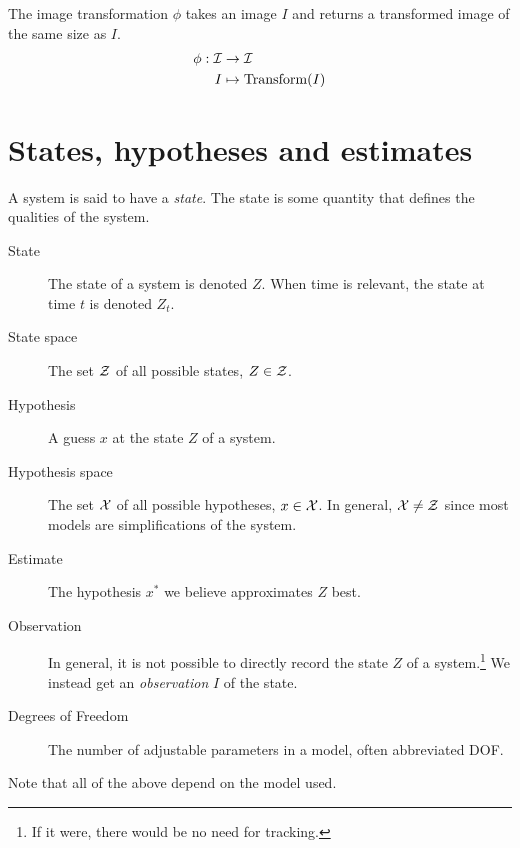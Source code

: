 \begin{definition}
    The image transformation $\phi$ takes an image $I$ and returns a transformed image of the same size as $I$.
    \begin{equation}
        \begin{split}
            \phi : \mathcal{I} &\rightarrow \mathcal{I}\\
                I &\mapsto \text{Transform}(I)
        \end{split}
    \end{equation}
\end{definition}


\section{States, hypotheses and estimates}
A system is said to have a \emph{state}. The state is some quantity that defines the qualities of the system.

\begin{description}
\item[State] The state of a system is denoted $Z$. When time is relevant, the state at time $t$ is denoted $Z_t$.
\item[State space] The set $\mathcal{Z}$ of all possible states, $Z \in \mathcal{Z}$.
\item[Hypothesis] A guess $x$ at the state $Z$ of a system.
\item[Hypothesis space] The set $\mathcal{X}$ of all possible hypotheses, $x \in \mathcal{X}$. In general, $\mathcal{X} \neq \mathcal{Z}$ since most models are simplifications of the system.
\item[Estimate] The hypothesis $x^*$ we believe approximates $Z$ best.
\item[Observation]
In general, it is not possible to directly record the state $Z$ of a system.\footnote{If it were, there would be no need for tracking.} We instead get an \emph{observation} $I$ of the state.
\item[Degrees of Freedom] The number of adjustable parameters in a model, often abbreviated DOF.
\end{description}

Note that all of the above depend on the  model used.

%

